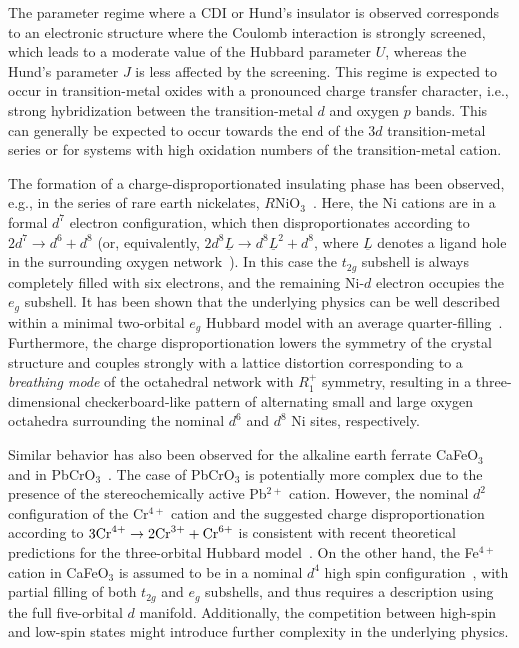 \documentclass[aps,prb,twocolumn,superscriptaddress,10pt]{revtex4-1}
\newcommand{\CFO}{CaFeO$_3$\xspace}
\begin{document}
The parameter regime where a CDI or Hund's insulator is observed corresponds to an electronic structure where the Coulomb interaction is strongly screened, which leads to a moderate value of the Hubbard parameter $U$, whereas the Hund's parameter $J$ is less affected by the screening. This regime is expected to occur in transition-metal oxides with a pronounced charge transfer character, i.e., strong hybridization between the transition-metal $d$ and oxygen $p$ bands. This can generally be expected to occur towards the end of the 3$d$ transition-metal series or for systems with high oxidation numbers of the transition-metal cation.

The formation of a charge-disproportionated insulating phase has been observed, e.g., in the series of rare earth nickelates, $R$NiO$_3$~\cite{alonso_charge_1999, alonso_room-temperature_2000, mazin_charge_2007, park_site-selective_2012, subedi_low-energy_2015, varignon_complete_2017, peil_mechanism_2019}. Here, the Ni cations are in a formal $d^7$ electron configuration, which then disproportionates according to $2d^7 \rightarrow d^6 + d^8$ (or, equivalently, $2d^8\underline L \rightarrow d^8\underline L^2 + d^8$, where $\underline L$ denotes a ligand hole in the surrounding oxygen network~\cite{mizokawa_spin_2000, johnston_charge_2014}). 
In this case the $t_{2g}$ subshell is always completely filled with six electrons, and the remaining Ni-$d$ electron occupies the $e_g$ subshell.
It has been shown that the underlying physics can be well described within a minimal two-orbital $e_g$ Hubbard model with an average quarter-filling~\cite{subedi_low-energy_2015}. 
%
Furthermore, the charge disproportionation lowers the symmetry of the crystal structure and couples strongly with a lattice distortion corresponding to a \emph{breathing mode} of the octahedral network with $R_1^+$ symmetry, resulting in a three-dimensional checkerboard-like pattern of alternating small and large oxygen octahedra surrounding the nominal $d^6$ and $d^8$ Ni sites, respectively.

Similar behavior has also been observed for the alkaline earth ferrate \CFO~\cite{takano_charge_1977, takeda_preparation_1978, kawasaki_phase_1998, woodward_structural_2000, takeda_metalsemiconductor_2000} and in PbCrO$_3$~\cite{wu_pressure-induced_2014, cheng_charge_2015}. The case of PbCrO$_3$ is potentially more complex due to the presence of the stereochemically active Pb$^{2+}$ cation. However, the nominal $d^2$ configuration of the Cr$^{4+}$ cation and the suggested charge disproportionation according to $3\rm{Cr}^{4+} \rightarrow 2\rm{Cr}^{3+} + \rm{Cr}^{6+}$ is consistent with recent theoretical predictions for the three-orbital Hubbard model~\cite{isidori_charge_2019}.
%
On the other hand, the Fe$^{4+}$ cation in \CFO is assumed to be in a nominal $d^4$ high spin configuration~\cite{takano_pressure-induced_1991}, 
with partial filling of both $t_{2g}$ and $e_g$ subshells, and thus requires a description using the full five-orbital $d$ manifold. Additionally, the competition between high-spin and low-spin states might introduce further complexity in the underlying physics. 
\end{document}
